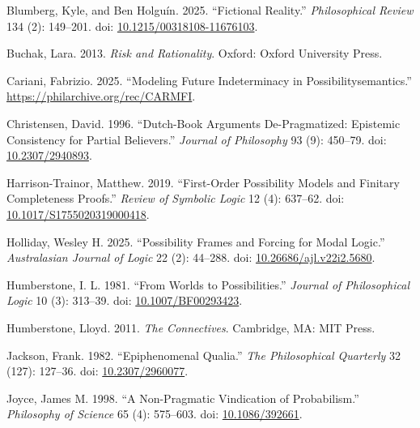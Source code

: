 \documentclass[
  11pt,
  letterpaper,
  DIV=11,
  numbers=noendperiod,
  twoside]{scrartcl}
\newlength{\cslhangindent}
\newenvironment{CSLReferences}[2] %
 {\begin{list}{}{%
  \setlength{\itemindent}{0pt}
  \setlength{\leftmargin}{0pt}
  \setlength{\parsep}{0pt}
  \ifodd #1
   \setlength{\leftmargin}{\cslhangindent}
   \setlength{\itemindent}{-1\cslhangindent}
  \fi
  \setlength{\itemsep}{#2\baselineskip}}}
 {\end{list}}
\begin{document}
\label{refs}
\begin{CSLReferences}{1}{0}
Blumberg, Kyle, and Ben Holguín. 2025. {``Fictional Reality.''}
\emph{Philosophical Review} 134 (2): 149--201. doi:
\href{https://doi.org/10.1215/00318108-11676103}{10.1215/00318108-11676103}.

Buchak, Lara. 2013. \emph{Risk and Rationality}. Oxford: Oxford
University Press.

Cariani, Fabrizio. 2025. {``Modeling Future Indeterminacy in
Possibilitysemantics.''} \url{https://philarchive.org/rec/CARMFI}.

Christensen, David. 1996. {``Dutch-Book Arguments {D}e-Pragmatized:
Epistemic Consistency for Partial Believers.''} \emph{Journal of
Philosophy} 93 (9): 450--79. doi:
\href{https://doi.org/10.2307/2940893}{10.2307/2940893}.

Harrison-Trainor, Matthew. 2019. {``First-Order Possibility Models and
Finitary Completeness Proofs.''} \emph{Review of Symbolic Logic} 12 (4):
637--62. doi:
\href{https://doi.org/10.1017/S1755020319000418}{10.1017/S1755020319000418}.

Holliday, Wesley H. 2025. {``Possibility Frames and Forcing for Modal
Logic.''} \emph{Australasian Journal of Logic} 22 (2): 44--288. doi:
\href{https://doi.org/10.26686/ajl.v22i2.5680}{10.26686/ajl.v22i2.5680}.

Humberstone, I. L. 1981. {``From Worlds to Possibilities.''}
\emph{Journal of Philosophical Logic} 10 (3): 313--39. doi:
\href{https://doi.org/10.1007/BF00293423}{10.1007/BF00293423}.

Humberstone, Lloyd. 2011. \emph{The Connectives}. Cambridge, MA: MIT
Press.

Jackson, Frank. 1982. {``Epiphenomenal Qualia.''} \emph{The
Philosophical Quarterly} 32 (127): 127--36. doi:
\href{https://doi.org/10.2307/2960077}{10.2307/2960077}.

Joyce, James M. 1998. {``A Non-Pragmatic Vindication of Probabilism.''}
\emph{Philosophy of Science} 65 (4): 575--603. doi:
\href{https://doi.org/10.1086/392661}{10.1086/392661}.


\end{CSLReferences}
\end{document}

